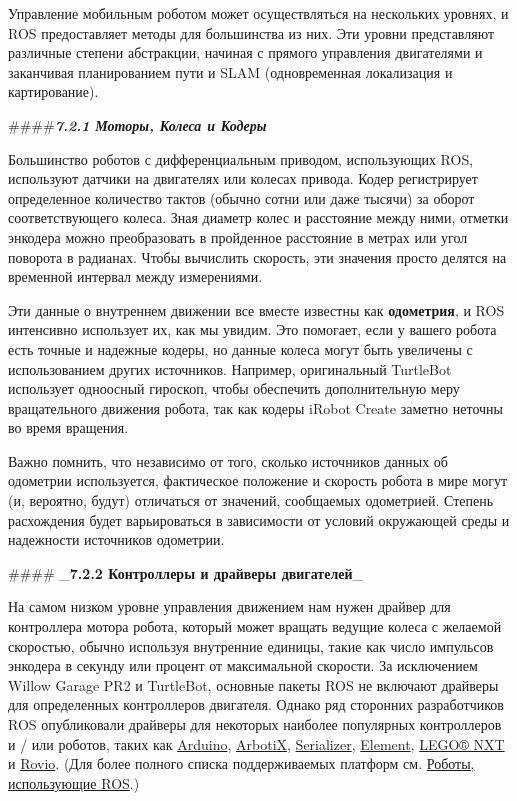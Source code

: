 

Управление мобильным роботом может осуществляться на нескольких уровнях, и ROS предоставляет методы для большинства из них. Эти уровни представляют различные степени абстракции, начиная с прямого управления двигателями и заканчивая планированием пути и SLAM (одновременная локализация и картирование).

####\textit{\textbf{7.2.1 Моторы, Колеса и Кодеры}}

Большинство роботов с дифференциальным приводом, использующих ROS, используют датчики на двигателях или колесах привода. Кодер регистрирует определенное количество тактов (обычно сотни или даже тысячи) за оборот соответствующего колеса. Зная диаметр колес и расстояние между ними, отметки энкодера можно преобразовать в пройденное расстояние в метрах или угол поворота в радианах. Чтобы вычислить скорость, эти значения просто делятся на временной интервал между измерениями. 

Эти данные о внутреннем движении все вместе известны как \textbf{одометрия}, и ROS интенсивно использует их, как мы увидим. Это помогает, если у вашего робота есть точные и надежные кодеры, но данные колеса могут быть увеличены с использованием других источников. Например, оригинальный TurtleBot использует одноосный гироскоп, чтобы обеспечить дополнительную меру вращательного движения робота, так как кодеры iRobot Create заметно неточны во время вращения. 

Важно помнить, что независимо от того, сколько источников данных об одометрии используется, фактическое положение и скорость робота в мире могут (и, вероятно, будут) отличаться от значений, сообщаемых одометрией. Степень расхождения будет варьироваться в зависимости от условий окружающей среды и надежности источников одометрии. 

#### _\textbf{7.2.2 Контроллеры и драйверы двигателей}_

 На самом низком уровне управления движением нам нужен драйвер для контроллера мотора робота, который может вращать ведущие колеса с желаемой скоростью, обычно используя внутренние единицы, такие как число импульсов энкодера в секунду или процент от максимальной скорости. За исключением Willow Garage PR2 и TurtleBot, основные пакеты ROS не включают драйверы для определенных контроллеров двигателя. Однако ряд сторонних разработчиков ROS опубликовали драйверы для некоторых наиболее популярных контроллеров и / или роботов, таких как \href{http://wiki.ros.org/ros_arduino_bridge}{Arduino}, \href{http://wiki.ros.org/arbotix}{ArbotiX}, \href{http://wiki.ros.org/serializer}{Serializer}, \href{http://wiki.ros.org/element}{Element}, \href{http://wiki.ros.org/Robots/NXT}{LEGO® NXT} и \href{http://wiki.ros.org/rovio}{Rovio}. (Для более полного списка поддерживаемых платформ см. \href{http://wiki.ros.org/Robots}{Роботы, использующие ROS}.) 

